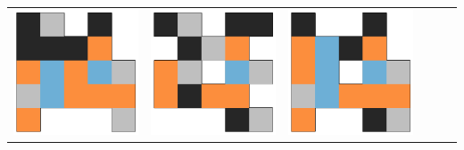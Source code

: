 \begin{tabular}{cccccc}
    \includegraphics[scale=0.1]{images/top_designs/pusher/ga/exp5/gen29_ind3} &
    \includegraphics[scale=0.1]{images/top_designs/pusher/ga/exp5/gen29_ind4} &
    \includegraphics[scale=0.1]{images/top_designs/pusher/ga/exp5/gen29_ind5} \\
\end{tabular}
